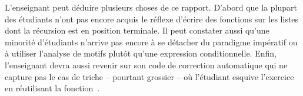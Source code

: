 L'enseignant peut déduire plusieurs choses de ce rapport. D'abord que
la plupart des étudiants n'ont pas encore acquis le réflexe d'écrire
des fonctions sur les listes dont la récursion est en position
terminale. Il peut constater aussi qu'une minorité d'étudiants
n'arrive pas encore à se détacher du paradigme impératif ou à utiliser
l'analyse de motifs plutôt qu'une expression conditionnelle. Enfin,
l'enseignant devra aussi revenir sur son code de correction automatique
qui ne capture pas le cas de triche -- pourtant grossier -- où l'étudiant
esquive l'exercice en réutilisant la fonction~.


